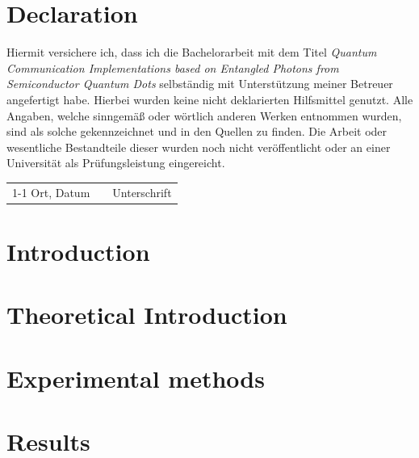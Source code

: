 
\setcounter{secnumdepth}{4} %
\setcounter{tocdepth}{4}    %



\chapter*{Declaration}
    Hiermit versichere ich, dass ich die Bachelorarbeit mit dem Titel \textit{Quantum Communication Implementations based on Entangled Photons from Semiconductor Quantum Dots} selbständig mit Unterstützung meiner Betreuer angefertigt habe. Hierbei wurden keine nicht deklarierten Hilfsmittel genutzt. Alle Angaben, welche sinngemäß oder wörtlich anderen Werken entnommen wurden, sind als solche gekennzeichnet und in den Quellen zu finden. Die Arbeit oder wesentliche Bestandteile dieser wurden noch nicht veröffentlicht oder an einer Universität als Prüfungsleistung eingereicht.
    
    \vspace*{4cm}
        \begin{tabular}{lp{2em}l}
            \hspace{4cm}   && \hspace{3cm} \\\cline{1-1}\cline{3-3}
            Ort, Datum     && Unterschrift
        \end{tabular}
    
\newpage
\tableofcontents
\newpage 
\chapter{Introduction}
%

\chapter{Theoretical Introduction}
%

\chapter{Experimental methods}
%

\chapter{Results}
%

